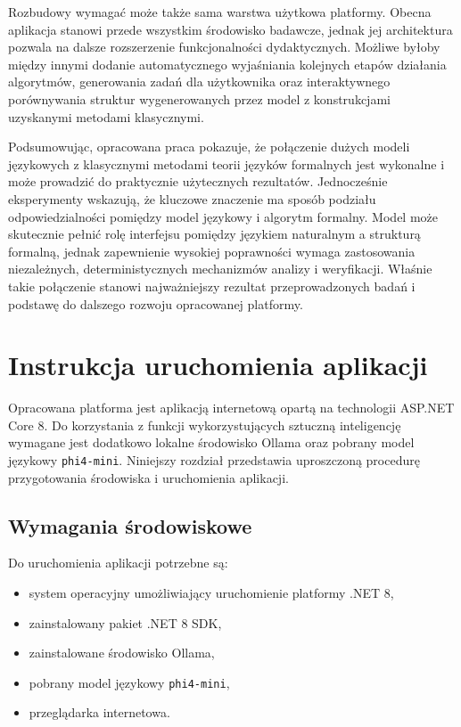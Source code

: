 \documentclass[12pt]{article}
\begin{document}
Rozbudowy wymagać może także sama warstwa użytkowa platformy. Obecna aplikacja stanowi przede wszystkim środowisko badawcze, jednak jej architektura pozwala na dalsze rozszerzenie funkcjonalności dydaktycznych. Możliwe byłoby między innymi dodanie automatycznego wyjaśniania kolejnych etapów działania algorytmów, generowania zadań dla użytkownika oraz interaktywnego porównywania struktur wygenerowanych przez model z konstrukcjami uzyskanymi metodami klasycznymi.

Podsumowując, opracowana praca pokazuje, że połączenie dużych modeli językowych z klasycznymi metodami teorii języków formalnych jest wykonalne i może prowadzić do praktycznie użytecznych rezultatów. Jednocześnie eksperymenty wskazują, że kluczowe znaczenie ma sposób podziału odpowiedzialności pomiędzy model językowy i algorytm formalny. Model może skutecznie pełnić rolę interfejsu pomiędzy językiem naturalnym a strukturą formalną, jednak zapewnienie wysokiej poprawności wymaga zastosowania niezależnych, deterministycznych mechanizmów analizy i weryfikacji. Właśnie takie połączenie stanowi najważniejszy rezultat przeprowadzonych badań i podstawę do dalszego rozwoju opracowanej platformy.






\clearpage
\section{Instrukcja uruchomienia aplikacji}

Opracowana platforma jest aplikacją internetową opartą na technologii ASP.NET Core 8. Do korzystania z funkcji wykorzystujących sztuczną inteligencję wymagane jest dodatkowo lokalne środowisko Ollama oraz pobrany model językowy \texttt{phi4-mini}. Niniejszy rozdział przedstawia uproszczoną procedurę przygotowania środowiska i uruchomienia aplikacji.

\subsection{Wymagania środowiskowe}

Do uruchomienia aplikacji potrzebne są:

\begin{itemize}
    \item system operacyjny umożliwiający uruchomienie platformy .NET 8,
    \item zainstalowany pakiet .NET 8 SDK,
    \item zainstalowane środowisko Ollama,
    \item pobrany model językowy \texttt{phi4-mini},
    \item przeglądarka internetowa.
\end{itemize}
\end{document}
